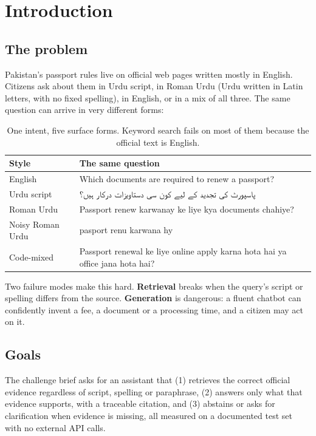 \documentclass[11pt,a4paper]{article}
\newcommand{\ur}[1]{{\urdufont\beginR #1\endR}}
\begin{document}
\tableofcontents
\newpage

\section{Introduction}
\label{sec:intro}

\subsection{The problem}
Pakistan's passport rules live on official web pages written mostly in English. Citizens ask about them in Urdu script, in
Roman Urdu (Urdu written in Latin letters, with no fixed spelling), in English, or in a mix of all three. The same question can
arrive in very different forms:

\begin{table}[H]
\centering\small
\begin{tabularx}{\textwidth}{@{}l X@{}}
\toprule
Style & The same question\\
\midrule
English & Which documents are required to renew a passport?\\
Urdu script & \ur{پاسپورٹ کی تجدید کے لیے کون سی دستاویزات درکار ہیں؟}\\
Roman Urdu & Passport renew karwanay ke liye kya documents chahiye?\\
Noisy Roman Urdu & pasport renu karwana hy\\
Code-mixed & Passport renewal ke liye online apply karna hota hai ya office jana hota hai?\\
\bottomrule
\end{tabularx}
\caption{One intent, five surface forms. Keyword search fails on most of them because the official text is English.}
\label{tab:forms}
\end{table}

Two failure modes make this hard. \textbf{Retrieval} breaks when the query's script or spelling differs from the source.
\textbf{Generation} is dangerous: a fluent chatbot can confidently invent a fee, a document or a processing time, and a
citizen may act on it.

\subsection{Goals}
The challenge brief asks for an assistant that (1) retrieves the correct official evidence regardless of script, spelling or
paraphrase, (2) answers only what that evidence supports, with a traceable citation, and (3) abstains or asks for
clarification when evidence is missing, all measured on a documented test set with no external API calls.
\end{document}
